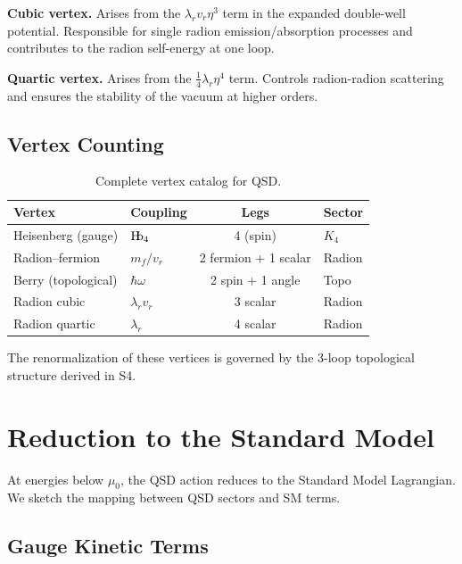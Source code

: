 \documentclass[11pt,a4paper]{article}
\theoremstyle{definition}
\theoremstyle{remark}
\newcommand{\Hb}{\textnormal{H\kern-0.3em b}}
\newcommand{\Hbfour}{\Hb_4}
\newcommand{\murad}{\mu_0}
\begin{document}
\noindent\textbf{Cubic vertex.}
Arises from the $\lambda_r v_r \eta^3$ term in the expanded double-well potential. Responsible for single radion emission/absorption processes and contributes to the radion self-energy at one loop.

\noindent\textbf{Quartic vertex.}
Arises from the $\frac{1}{4}\lambda_r \eta^4$ term. Controls radion-radion scattering and ensures the stability of the vacuum at higher orders.

\subsection{Vertex Counting}

\begin{table}[H]
\centering
\begin{tabular}{llcl}
\toprule
\textbf{Vertex} & \textbf{Coupling} & \textbf{Legs} & \textbf{Sector} \\
\midrule
Heisenberg (gauge) & $\Hbfour$ & 4 (spin) & $K_4$ \\
Radion--fermion & $m_f/v_r$ & 2 fermion + 1 scalar & Radion \\
Berry (topological) & $\hbar\omega$ & 2 spin + 1 angle & Topo \\
Radion cubic & $\lambda_r v_r$ & 3 scalar & Radion \\
Radion quartic & $\lambda_r$ & 4 scalar & Radion \\
\bottomrule
\end{tabular}
\caption{Complete vertex catalog for QSD.}
\label{tab:vertices}
\end{table}

The renormalization of these vertices is governed by the 3-loop topological structure derived in S4.

\section{Reduction to the Standard Model}
\label{sec:SM}

At energies below $\murad$, the QSD action reduces to the Standard Model Lagrangian. We sketch the mapping between QSD sectors and SM terms.

\subsection{Gauge Kinetic Terms}
\end{document}
